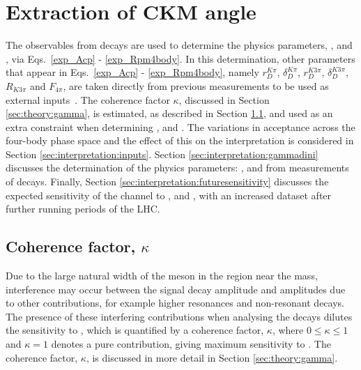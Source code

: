 \clearpage
%

\chapter{\label{ch:6-interpretation}Extraction of CKM angle \Pgamma} 


The \CP observables from \btodkst decays are used to determine the physics parameters, \rb, \deltab and \Pgamma, via Eqs.~\ref{exp_Acp} - \ref{exp_Rpm4body}. In this determination, other parameters that appear in Eqs.~\ref{exp_Acp} - \ref{exp_Rpm4body}, namely $r_D^{K\pi}$, $\delta_D^{K\pi}$, $r_D^{K3\pi}$, $\delta_D^{K3\pi}$, $R_{K3\pi}$ and $F_{4\pi}$, are taken directly from previous measurements to be used as external inputs~\cite{HFAG,charmk3pi,charmk3pi_errata,LHCb-PAPER-2015-057,charm4pi}. The coherence factor $\kappa$, discussed in Section \ref{sec:theory:gamma}, is estimated, as described in Section \ref{sec:interpretation:coherence}, and used as an extra constraint when determining \rb, \deltab and \Pgamma. The variations in acceptance across the four-body phase space and the effect of this on the interpretation is considered in Section \ref{sec:interpretation:inputs}. Section \ref{sec:interpretation:gammadini} discusses the determination of the physics parameters: \rb, \deltab and \Pgamma from measurements of \btodkst decays. Finally, Section \ref{sec:interpretation:futuresensitivity} discusses the expected sensitivity of the \btodkst channel to \rb, \deltab and \Pgamma, with an increased dataset after further running periods of the LHC.

\section{Coherence factor, $\kappa$}
\label{sec:interpretation:coherence}

Due to the large natural width of the \Kstarm meson in the region near the \Kstarm mass, interference may occur between the signal \Kstarm decay amplitude and amplitudes due to other \decay{\Bm}{\D\KS\pim} contributions, for example higher \KS\pim resonances and non-resonant decays. The presence of these interfering contributions when analysing the \btodkst decays dilutes the sensitivity to \Pgamma, which is quantified by a coherence factor, $\kappa$, where $0 \leq \kappa \leq 1$ and $\kappa = 1$ denotes a pure \Kstarm contribution, giving maximum sensitivity to \Pgamma. The coherence factor, $\kappa$, is discussed in more detail in Section \ref{sec:theory:gamma}. 

